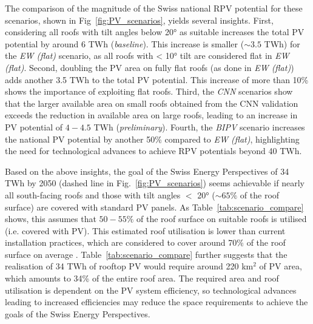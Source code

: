 The comparison of the magnitude of the Swiss national RPV potential for these scenarios, shown in Fig~\ref{fig:PV_scenarios}, yields several insights.
First, considering all roofs with tilt angles below 20° as suitable increases the total PV potential by around 6 TWh (\textit{baseline}). This increase is smaller ($\sim 3.5$ TWh) for the  \textit{EW (flat)} scenario, as all roofs with < 10° tilt are considered flat in \textit{EW (flat)}.
Second, doubling the PV area on fully flat roofs (as done in \textit{EW (flat)}) adds another 3.5 TWh to the total PV potential. This increase of more than 10\% shows the importance of exploiting flat roofs. 
Third, the \textit{CNN} scenarios show that the larger available area on small roofs obtained from the CNN validation exceeds the reduction in available area on large roofs, leading to an increase in PV potential of $4-4.5$ TWh (\textit{preliminary}). 
Fourth, the \textit{BIPV} scenario increases the national PV potential by another 50\% compared to \textit{EW (flat)}, highlighting the need for technological advances to achieve RPV potentials beyond 40 TWh.

Based on the above insights, the goal of the Swiss Energy Perspectives of 34 TWh by 2050 (dashed line in Fig.~\ref{fig:PV_scenarios}) seems achievable if nearly all south-facing roofs and those with tilt angles $<$ 20° ($\sim 65\%$ of the roof surface) are covered with standard PV panels. As Table~\ref{tab:scenario_compare} shows, this assumes that $50 - 55\%$ of the roof surface on suitable roofs is utilised (i.e. covered with PV). This estimated roof utilisation is lower than current installation practices, which are considered to cover around 70\% of the roof surface on average \cite{portmann_sonnendach.ch:_2016}.
Table~\ref{tab:scenario_compare}  further suggests that the realisation of 34 TWh of rooftop PV would require around 220 km$^2$ of PV area, which amounts to 34\% of the entire roof area.
The required area and roof utilisation is dependent on the PV system efficiency, so technological advances leading to increased efficiencies may reduce the space requirements to achieve the goals of the Swiss Energy Perspectives.

